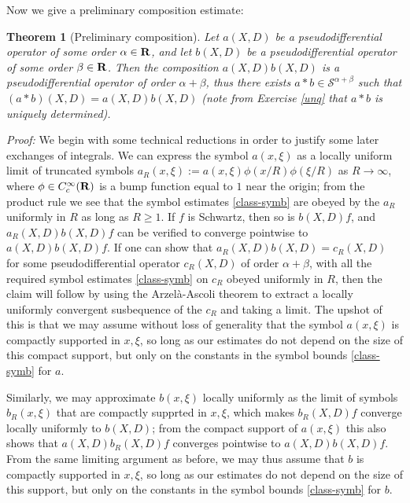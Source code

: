\documentclass[11pt]{article}
\newtheorem{theorem}{Theorem}
\theoremstyle{definition}
\begin{document}
Now we give a preliminary composition estimate:

\begin{theorem}[Preliminary composition]
 \label{precomp} Let \({a(X,D)}\) be a pseudodifferential operator of some order \({\alpha \in {\bf R}}\), and let \({b(X,D)}\) be a pseudodifferential operator of some order \({\beta \in {\bf R}}\). Then the composition \({a(X,D) b(X,D)}\) is a pseudodifferential operator of order \({\alpha+\beta}\), thus there exists \({a*b \in {\mathcal S}^{\alpha+\beta}}\) such that \({(a*b)(X,D) = a(X,D) b(X,D)}\) (note from Exercise \ref{unq} that \({a*b}\) is uniquely determined). 
\end{theorem}

\emph{Proof:}  We begin with some technical reductions in order to justify some later exchanges of integrals. We can express the symbol \({a(x,\xi)}\) as a locally uniform limit of truncated symbols \({a_R(x,\xi) := a(x,\xi) \phi(x/R) \phi(\xi/R)}\) as \({R \rightarrow \infty}\), where \({\phi \in C^\infty_c({\bf R})}\) is a bump function equal to \({1}\) near the origin; from the product rule we see that the symbol estimates \eqref{class-symb} are obeyed by the \({a_R}\) uniformly in \({R}\) as long as \({R \geq 1}\). If \({f}\) is Schwartz, then so is \({b(X,D) f}\), and \({a_R(X,D) b(X,D) f}\) can be verified to converge pointwise to \({a(X,D) b(X,D) f}\). If one can show that \({a_R(X,D) b(X,D) = c_R(X,D)}\) for some pseudodifferential operator \({c_R(X,D)}\) of order \({\alpha+\beta}\), with all the required symbol estimates \eqref{class-symb} on \({c_R}\) obeyed uniformly in \({R}\), then the claim will follow by using the Arzelà-Ascoli theorem to extract a locally uniformly convergent susbequence of the \({c_R}\) and taking a limit. The upshot of this is that we may assume without loss of generality that the symbol \({a(x,\xi)}\) is compactly supported in \({x,\xi}\), so long as our estimates do not depend on the size of this compact support, but only on the constants in the symbol bounds \eqref{class-symb} for \({a}\).


Similarly, we may approximate \({b(x,\xi)}\) locally uniformly as the limit of symbols \({b_R(x,\xi)}\) that are compactly supprted in \({x,\xi}\), which makes \({b_R(X,D) f}\) converge locally uniformly to \({b(X,D)}\); from the compact support of \({a(x,\xi)}\) this also shows that \({a(X,D) b_R(X,D) f}\) converges pointwise to \({a(X,D) b(X,D) f}\). From the same limiting argument as before, we may thus assume that \({b}\) is compactly supported in \({x,\xi}\), so long as our estimates do not depend on the size of this support, but only on the constants in the symbol bounds \eqref{class-symb} for \({b}\).
\end{document}
